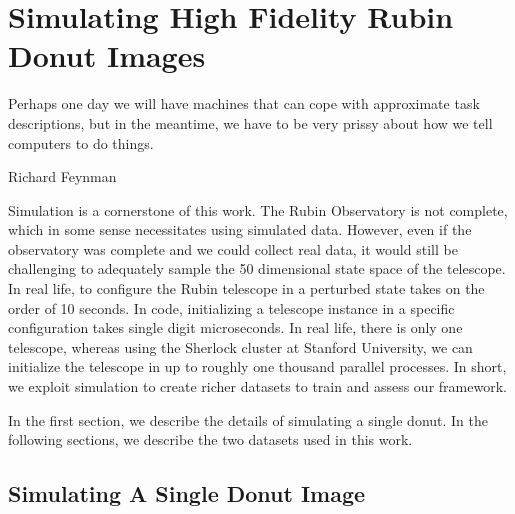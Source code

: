 \chapter{Simulating High Fidelity Rubin Donut Images}
\label{chap:sim}


\epigraph{Perhaps one day we will have machines that can cope with approximate task descriptions, but in the meantime, we have to be very prissy about how we tell computers to do things.}{Richard Feynman}

Simulation is a cornerstone of this work. The Rubin Observatory is not complete, which in some sense necessitates using simulated data. However, even if the observatory was complete and we could collect real data, it would still be challenging to adequately sample the 50 dimensional state space of the telescope. In real life, to configure the Rubin telescope in a perturbed state takes on the order of 10 seconds. In code, initializing a telescope instance in a specific configuration takes single digit microseconds. In real life, there is only one telescope, whereas using the Sherlock cluster at Stanford University, we can initialize the telescope in up to roughly one thousand parallel processes. In short, we exploit simulation to create richer datasets to train and assess our framework.

In the first section, we describe the details of simulating a single donut. In the following sections, we describe the two datasets used in this work. 

\section{Simulating A Single Donut Image}

